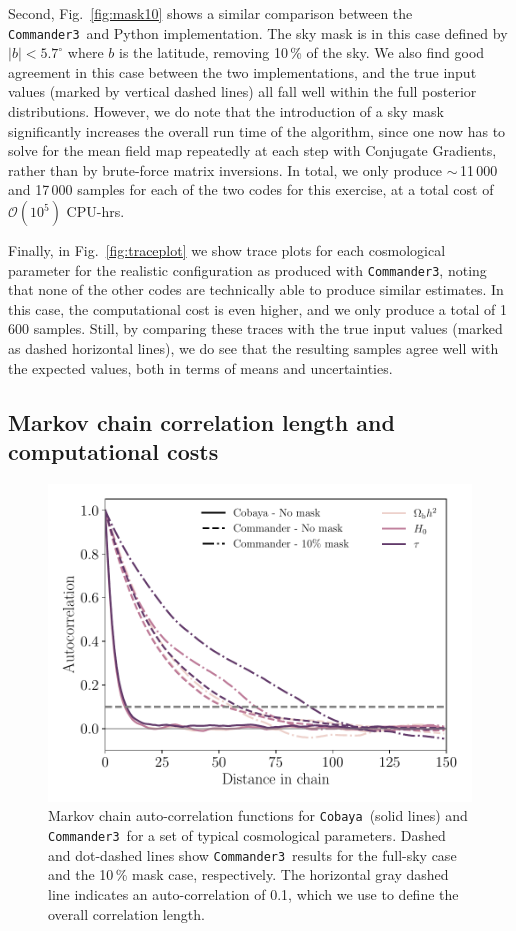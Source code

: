 \documentclass[twocolumn]{../common/aa}
\def\commanderthree{\texttt{Commander3}}
\def\cobaya{\texttt{Cobaya}}
\begin{document}
Second, Fig.~\ref{fig:mask10} shows a similar comparison between the \commanderthree\ and Python implementation. The sky mask is in this case defined by $|b|<5.7^{\circ}$ where $b$ is the latitude, removing 10\,\% of the sky. We also find good agreement in this case between the two implementations, and the true input values (marked by vertical dashed lines) all fall well within the full posterior distributions. However, we do note that the introduction of a sky mask significantly increases the overall run time of the algorithm, since one now has to solve for the mean field map repeatedly at each step with Conjugate Gradients, rather than by brute-force matrix inversions. In total, we only produce $\sim$\,11\,000 and 17\,000 samples for each of the two codes for this exercise, at a total cost of $\mathcal{O}(10^5)$ CPU-hrs.

Finally, in Fig.~\ref{fig:traceplot} we show trace plots for each cosmological parameter for the realistic configuration as produced with \commanderthree, noting that none of the other codes are technically able to produce similar estimates. In this case, the computational cost is even higher, and we only produce a total of 1\,600 samples. Still, by comparing these traces with the true input values (marked as dashed horizontal lines), we do see that the resulting samples agree well with the expected values, both in terms of means and uncertainties. 

\subsection{Markov chain correlation length and computational costs}
\label{sec:resources}

\begin{figure}
	\centering
	\includegraphics[width=\linewidth]{figures/auto_correlation.pdf}
	\caption{\label{fig:autocorrelation}Markov chain auto-correlation functions for \cobaya\ (solid lines) and \commanderthree\ for a set of typical cosmological parameters. Dashed and dot-dashed lines show \commanderthree\ results for the full-sky case and the 10\,\% mask case, respectively. The horizontal gray dashed line indicates an auto-correlation of 0.1, which we use to define the overall correlation length.   }
\end{figure}
\end{document}
